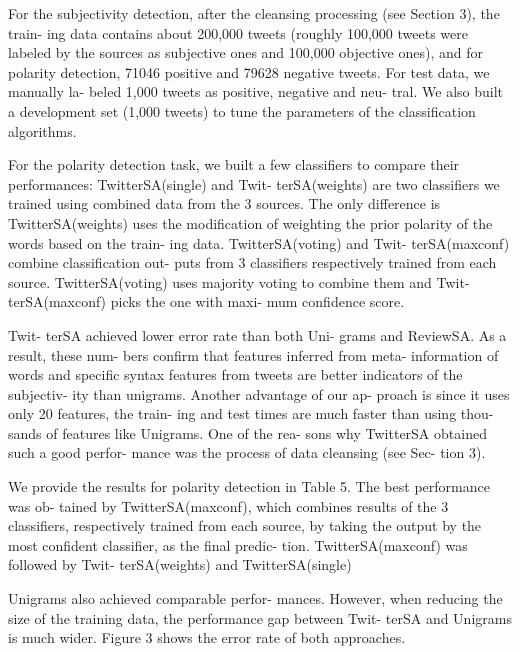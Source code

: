 For the subjectivity detection, after the cleansing processing (see
Section 3), the train- ing data contains about 200,000 tweets (roughly
100,000 tweets were labeled by the sources as subjective ones and
100,000 objective ones), and for polarity detection, 71046 positive
and 79628 negative tweets. For test data, we manually la- beled 1,000
tweets as positive, negative and neu- tral. We also built a
development set (1,000 tweets) to tune the parameters of the
classification algorithms.

For the polarity detection task, we built a few classifiers to compare
their performances: TwitterSA(single) and Twit- terSA(weights) are two
classifiers we trained using combined data from the 3 sources.  The
only difference is TwitterSA(weights) uses the modification of
weighting the prior polarity of the words based on the train- ing
data.  TwitterSA(voting) and Twit- terSA(maxconf) combine
classification out- puts from 3 classifiers respectively trained from
each source. TwitterSA(voting) uses majority voting to combine them
and Twit- terSA(maxconf) picks the one with maxi- mum confidence
score.

Twit- terSA achieved lower error rate than both Uni- grams and
ReviewSA. As a result, these num- bers confirm that features inferred
from meta- information of words and specific syntax features from
tweets are better indicators of the subjectiv- ity than
unigrams. Another advantage of our ap- proach is since it uses only 20
features, the train- ing and test times are much faster than using
thou- sands of features like Unigrams. One of the rea- sons why
TwitterSA obtained such a good perfor- mance was the process of data
cleansing (see Sec- tion 3).

We provide the results for polarity detection in Table 5. The best
performance was ob- tained by TwitterSA(maxconf), which combines
results of the 3 classifiers, respectively trained from each source,
by taking the output by the most confident classifier, as the final
predic- tion. TwitterSA(maxconf) was followed by Twit- terSA(weights)
and TwitterSA(single)

Unigrams also achieved comparable perfor- mances. However, when
reducing the size of the training data, the performance gap between
Twit- terSA and Unigrams is much wider. Figure 3 shows the error rate
of both approaches.

\todo[inline]{}

